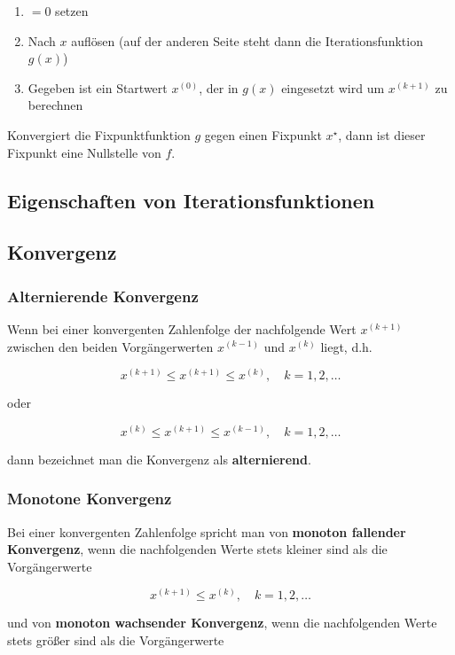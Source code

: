 \documentclass[a4paper, twoside]{article}
\begin{document}
\begin{enumerate}
\item \(=0\) setzen
\item Nach \(x\) auflösen (auf der anderen Seite steht dann die Iterationsfunktion \(g(x)\))
\item Gegeben ist ein Startwert \(x^{(0)}\), der in \(g(x)\) eingesetzt wird um \(x^{(k+1)}\) zu berechnen
\end{enumerate}

Konvergiert die Fixpunktfunktion \(g\) gegen einen Fixpunkt \(x^{\star}\), dann ist dieser Fixpunkt eine Nullstelle von \(f\).

\subsection{Eigenschaften von Iterationsfunktionen}

\subsection{Konvergenz}

\subsubsection{Alternierende Konvergenz}

Wenn bei einer konvergenten Zahlenfolge der nachfolgende Wert \(x^{(k+1)}\) zwischen den beiden Vorgängerwerten \(x^{(k-1)}\) und \(x^{(k)}\) liegt, d.h.

\[x^{(k+1)} \leq x^{(k+1)} \leq x^{(k)},\quad k = 1, 2, \ldots\]

oder

\[x^{(k)} \leq x^{(k+1)} \leq x^{(k-1)},\quad k = 1, 2, \ldots\]

dann bezeichnet man die Konvergenz als \textbf{alternierend}.

\subsubsection{Monotone Konvergenz}

Bei einer konvergenten Zahlenfolge spricht man von \textbf{monoton fallender Konvergenz},
wenn die nachfolgenden Werte stets kleiner sind als die Vorgängerwerte

\[x^{(k+1)} \leq x^{(k)},\quad k = 1, 2, \ldots\]

und von \textbf{monoton wachsender Konvergenz}, wenn die nachfolgenden Werte stets
größer sind als die Vorgängerwerte
\end{document}
